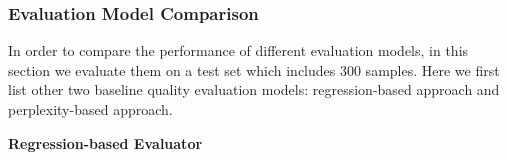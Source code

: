 \documentclass{article}
\begin{document}





 \subsubsection{Evaluation Model Comparison}
 
 In order to compare the performance of different evaluation models, in this section we evaluate them on a test set which includes 300 samples. Here we first list other two baseline quality evaluation models: regression-based approach and perplexity-based approach.
 
 \textbf{Regression-based Evaluator}
 
\end{document}

